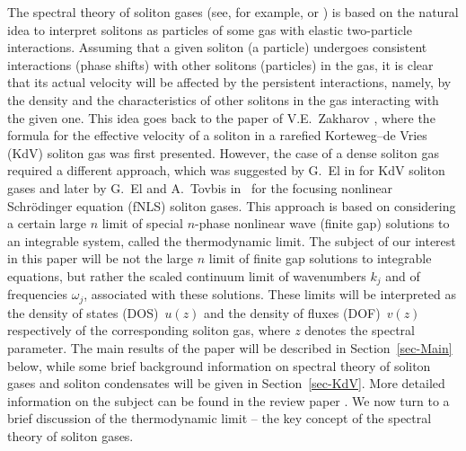 \documentclass[pdftex]{sigma}
\numberwithin{equation}{section}
\renewcommand{\o}{\omega}
\def\o{\omega}
\begin{document}
The spectral theory of soliton gases (see, for example, \cite{ET2020} or \cite[Section~3]{ElRew1}) is based on the natural idea to interpret solitons as particles of some gas with elastic two-particle interactions. Assuming that a given soliton (a particle) undergoes consistent interactions (phase shifts) with other solitons (particles) in the gas, it is clear that its actual velocity will be affected by the persistent interactions, namely, by the density and the characteristics of other solitons in the gas interacting with the given one. This idea goes back to the paper of V.E.~Zakharov \cite{Za71}, where the formula for the effective velocity of a soliton in a rarefied Korteweg--de Vries (KdV) soliton gas was first presented. However, the case of a dense soliton gas required a different approach, which was suggested by G.~El in \cite{El2003} for KdV soliton gases and later by G.~El and A.~Tovbis in~\cite{ET2020} for the focusing nonlinear Schr\"odinger equation (fNLS)
soliton gases. This approach is based on considering a certain large $n$ limit of special $n$-phase nonlinear wave (finite gap) solutions to an integrable system, called the thermodynamic limit. The subject of our interest in this paper will be not the large $n$ limit of finite gap solutions to integrable equations, but rather the scaled continuum limit of wavenumbers $k_j$ and of frequencies $\o_j$, associated with these solutions. These limits will be interpreted as the density of states (DOS)~$u(z)$ and the density of fluxes (DOF)~$v(z)$ respectively of the corresponding soliton gas, where $z$ denotes the spectral parameter. The main results of the paper will be described in Section~\ref{sec-Main} below, while some brief background information on spectral theory of soliton gases and soliton condensates will be given in Section~\ref{sec-KdV}.
	More detailed information on the subject can be found in the review paper \cite{ElRew1}. We now turn to a brief discussion of the thermodynamic limit -- the key concept of the spectral theory of soliton gases.
\end{document}
